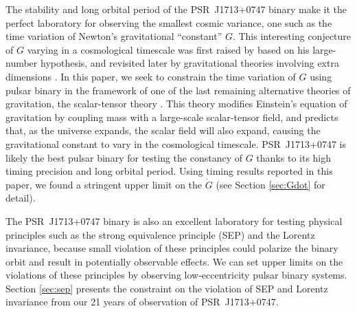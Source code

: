 The stability and long orbital period of the PSR~J1713+0747 binary make it the
perfect laboratory for observing the smallest cosmic variance, 
one such as the time variation of Newton's gravitational ``constant'' $G$. 
This interesting conjecture of $G$ varying in a cosmological timescale was first 
raised by \citet{dir37} based on his large-number hypothesis, and 
revisited later by gravitational theories involving extra dimensions
\citep{mar84,ww86a}.
In this paper, we seek to constrain the time variation of $G$ using pulsar
binary in the framework of one of the last remaining alternative theories of gravitation, the scalar-tensor theory \citep{jor59,fie56,bd61}. 
This theory modifies Einstein's equation of gravitation by coupling mass with
a large-scale scalar-tensor field, and predicts that, as the universe expands,
the scalar field will also expand, causing the gravitational constant to vary  
in the cosmological timescale. 
PSR~J1713+0747 is likely the best pulsar binary for testing the constancy of
$G$ thanks to its high timing precision and long orbital period. Using timing
results reported in this paper, we found a stringent upper limit on the
$\dot{G}$ (see Section \ref{sec:Gdot} for detail). 

The PSR~J1713+0747 binary is also an excellent laboratory for testing physical 
principles such as the strong equivalence principle (SEP) and the Lorentz invariance, because small violation of these principles could polarize the
binary orbit and result in potentially observable effects. We can set
upper limits on the violations of these principles by observing
low-eccentricity pulsar binary systems. Section \ref{sec:sep} presents the
constraint on the violation of SEP and Lorentz invariance from our 21 years of observation of PSR~J1713+0747.

